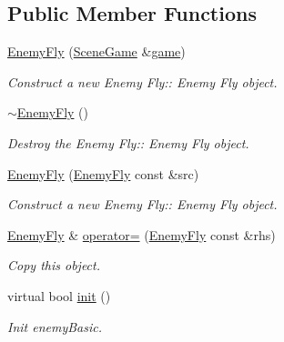 \subsection*{Public Member Functions}
\begin{DoxyCompactItemize}
\item 
\hyperlink{class_enemy_fly_a72b9e7e8a82679f4406c7825f29907c3}{Enemy\+Fly} (\hyperlink{class_scene_game}{Scene\+Game} \&\hyperlink{class_a_entity_aa2c05db944a8b7487eb8470dd20211ab}{game})
\begin{DoxyCompactList}\small\item\em Construct a new Enemy Fly\+:\+: Enemy Fly object. \end{DoxyCompactList}\item 
\mbox{\label{class_enemy_fly_aecace5eec4a1dd434bfc9467a5b677db}} 
\hyperlink{class_enemy_fly_aecace5eec4a1dd434bfc9467a5b677db}{$\sim$\+Enemy\+Fly} ()
\begin{DoxyCompactList}\small\item\em Destroy the Enemy Fly\+:\+: Enemy Fly object. \end{DoxyCompactList}\item 
\hyperlink{class_enemy_fly_a4bc5d6bc62289f70fe57abe139b053b1}{Enemy\+Fly} (\hyperlink{class_enemy_fly}{Enemy\+Fly} const \&src)
\begin{DoxyCompactList}\small\item\em Construct a new Enemy Fly\+:\+: Enemy Fly object. \end{DoxyCompactList}\item 
\hyperlink{class_enemy_fly}{Enemy\+Fly} \& \hyperlink{class_enemy_fly_a396255e79ad4f8419c20d1cc318499d5}{operator=} (\hyperlink{class_enemy_fly}{Enemy\+Fly} const \&rhs)
\begin{DoxyCompactList}\small\item\em Copy this object. \end{DoxyCompactList}\item 
virtual bool \hyperlink{class_enemy_fly_a8957442e19b91b06bf1f3bb650d66a8c}{init} ()
\begin{DoxyCompactList}\small\item\em Init enemy\+Basic. \end{DoxyCompactList}\end{DoxyCompactItemize}
